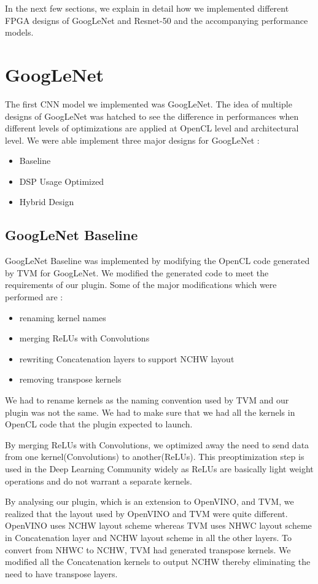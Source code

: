 In the next few sections, we explain in detail how we implemented different FPGA designs of GoogLeNet and Resnet-50 and the accompanying performance models.



\section{GoogLeNet}

The first CNN model we implemented was GoogLeNet. The idea of multiple designs of GoogLeNet was hatched to see the difference in performances when different levels of optimizations are applied at OpenCL level and architectural level. 
We were able implement three major designs for GoogLeNet :
\begin{itemize}
  \item Baseline
  \item DSP Usage Optimized
  \item Hybrid Design
\end{itemize}  

\subsection{GoogLeNet Baseline}

GoogLeNet Baseline was implemented by modifying the OpenCL code generated by TVM for GoogLeNet. We modified the generated code to meet the requirements of our plugin. Some of the major modifications which were performed are :
\begin{itemize}
  \item renaming kernel names
  \item merging ReLUs with Convolutions
  \item rewriting Concatenation layers to support NCHW layout
  \item removing transpose kernels
\end{itemize}  
We had to rename kernels as the naming convention used by TVM and our plugin was not the same. We  had to make sure that we had all the kernels in OpenCL code that the plugin expected to launch.

By merging ReLUs with Convolutions, we optimized away the need to send data from one kernel(Convolutions) to another(ReLUs). This preoptimization step is used in the Deep Learning Community widely as ReLUs are basically light weight operations and do not warrant a separate kernels.

By analysing our plugin, which is an extension to OpenVINO, and TVM, we realized that the layout used by OpenVINO and TVM were quite different. OpenVINO uses NCHW layout scheme whereas TVM uses NHWC layout scheme in Concatenation layer and NCHW layout scheme in all the other layers. To convert from NHWC to NCHW, TVM had generated transpose kernels. We modified all the Concatenation kernels to output NCHW thereby eliminating the need to have transpose layers.  

